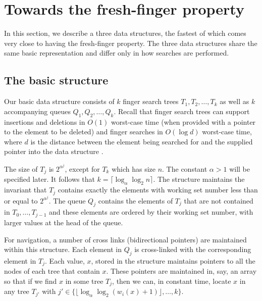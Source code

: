 \documentclass{llncs}
\newcommand{\BigOh}[1]{O\!\left(#1\right)}
\begin{document}
\section{Towards the fresh-finger property}
\label{section:main}

In this section, we describe a three data structures, the fastest of which
comes very close to having the fresh-finger property.  The three data structures share the same basic representation and differ only in how searches are performed.

\subsection{The basic structure}
\label{section:main:datastructure}

Our basic data structure consists of $k$ finger search trees $T_1,T_2,\ldots,T_k$ as well as $k$ accompanying queues $Q_1,Q_2,\ldots,Q_k$. Recall that finger search trees can support insertions and deletions in $\BigOh{1}$ worst-case time (when provided with a pointer to the element to be deleted) and finger searches in $\BigOh{\log d}$ worst-case time, where $d$ is the distance between the element being searched for and the supplied pointer into the data structure \cite{DBLP:journals/jcss/BrodalLMTT03}. %

The size of $T_j$ is $2^{\alpha^j}$, except for $T_k$ which has size $n$. The constant $\alpha>1$ will be specified later. It follows that $k=\lceil \log_\alpha\log_2 n\rceil$. The structure maintains the invariant that $T_j$
contains exactly the elements with working set number less than
or equal to $2^{\alpha^j}$.  The queue $Q_j$ contains the elements of $T_j$
that are not contained in $T_0,\ldots,T_{j-1}$ and these elements are ordered by their working set number, with larger values at the head of the queue.

For navigation, a number of cross links (bidirectional pointers) are maintained within this structure.  Each element in $Q_j$ is cross-linked with the corresponding element in $T_j$.  Each value, $x$, stored in the structure maintains pointers to all the nodes of each tree that contain $x$.  These pointers are maintained in, say, an array so that if we find $x$ in some tree $T_j$, then we can, in constant time, locate $x$ in any tree $T_{j'}$ with $j'\in\{\lfloor\log_\alpha\log_2(w_i(x)+1)\rfloor,\ldots,k\}$. 
\end{document}
